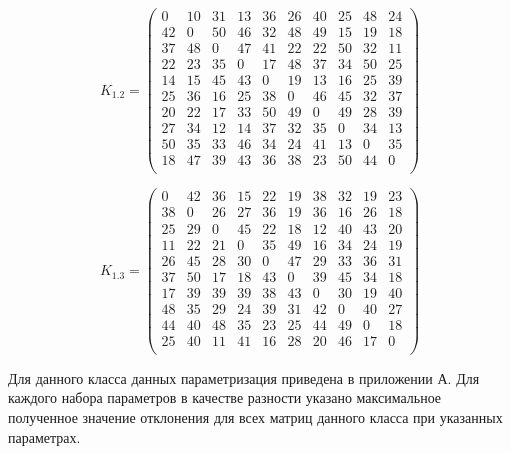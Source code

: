 \begin{equation}
	\label{eq:kd1.2}
	K_{1.2} = \begin{pmatrix}
		0 & 10 & 31 & 13 & 36 & 26 & 40 & 25 & 48 & 24 \\
		42 & 0 & 50 & 46 & 32 & 48 & 49 & 15 & 19 & 18 \\
		37 & 48 & 0 & 47 & 41 & 22 & 22 & 50 & 32 & 11 \\
		22 & 23 & 35 & 0 & 17 & 48 & 37 & 34 & 50 & 25 \\
		14 & 15 & 45 & 43 & 0 & 19 & 13 & 16 & 25 & 39 \\
		25 & 36 & 16 & 25 & 38 & 0 & 46 & 45 & 32 & 37 \\
		20 & 22 & 17 & 33 & 50 & 49 & 0 & 49 & 28 & 39 \\
		27 & 34 & 12 & 14 & 37 & 32 & 35 & 0 & 34 & 13 \\
		50 & 35 & 33 & 46 & 34 & 24 & 41 & 13 & 0 & 35 \\
		18 & 47 & 39 & 43 & 36 & 38 & 23 & 50 & 44 & 0 \\
	\end{pmatrix}
\end{equation}

\begin{equation}
	\label{eq:kd1.3}
	K_{1.3} = \begin{pmatrix}
		0 & 42 & 36 & 15 & 22 & 19 & 38 & 32 & 19 & 23 \\
		38 & 0 & 26 & 27 & 36 & 19 & 36 & 16 & 26 & 18 \\
		25 & 29 & 0 & 45 & 22 & 18 & 12 & 40 & 43 & 20 \\
		11 & 22 & 21 & 0 & 35 & 49 & 16 & 34 & 24 & 19 \\
		26 & 45 & 28 & 30 & 0 & 47 & 29 & 33 & 36 & 31 \\
		37 & 50 & 17 & 18 & 43 & 0 & 39 & 45 & 34 & 18 \\
		17 & 39 & 39 & 39 & 38 & 43 & 0 & 30 & 19 & 40 \\
		48 & 35 & 29 & 24 & 39 & 31 & 42 & 0 & 40 & 27 \\
		44 & 40 & 48 & 35 & 23 & 25 & 44 & 49 & 0 & 18 \\
		25 & 40 & 11 & 41 & 16 & 28 & 20 & 46 & 17 & 0 \\
	\end{pmatrix}
\end{equation}

Для данного класса данных параметризация приведена в приложении А.
Для каждого набора параметров в качестве разности указано максимальное полученное значение отклонения для всех матриц данного класса при указанных параметрах.

